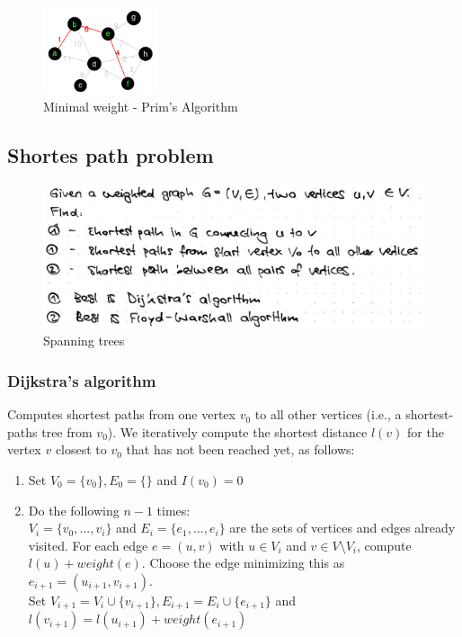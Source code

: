 \begin{figure}[H]
\centering
\includegraphics[width=0.3\textwidth]{figures/primsGraphAlg.png}
\caption{Minimal weight - Prim's Algorithm}
\end{figure}

\subsection{Shortes path problem}

\begin{figure}[H]
\centering
\includegraphics[width=1\textwidth]{figures/shortestPathProblem.png}
\caption{Spanning trees}
\end{figure}

\clearpage
\subsubsection{Dijkstra's algorithm}
Computes shortest paths from one vertex $v_0$ to all other vertices (i.e., a shortest-paths tree from $v_0$).
We iteratively compute the shortest distance $l(v)$ for the vertex
$v$ closest to $v_0$ that has not been reached yet, as follows:

\begin{enumerate}
    \item Set $V_0 = \{v_0\}, E_0 = \{\}$ and $I(v_0) = 0$
    \item Do the following $n-1$ times: \\
    $V_i = \{v_0, ..., v_i\}$ and $E_i = \{e_1, ..., e_i\}$ are the sets of vertices and edges already visited. For each edge $e = (u, v)$ with $u \in V_i$ and $v \in V \setminus V_i$, compute $l(u) + weight(e)$. Choose the edge minimizing this as $e_{i+1} = (u_{i+1}, v_{i+1})$. \\
    Set $V_{i+1} = V_i  \cup \{v_{i+1}\}, E_{i+1} = E_i \cup \{e_{i+1}\}$ and $l(v_{i+1}) = l(u_{i+1}) + weight(e_{i+1})$
\end{enumerate}

